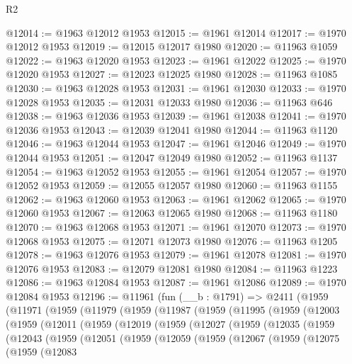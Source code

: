 \begin{lexlean}{R2}
\begin{coremodule}
@12014 := @1963 @12012 @1953
@12015 := @1961 @12014
@12017 := @1970 @12012 @1953
@12019 := @12015 @12017 @1980
@12020 := @11963 @1059
@12022 := @1963 @12020 @1953
@12023 := @1961 @12022
@12025 := @1970 @12020 @1953
@12027 := @12023 @12025 @1980
@12028 := @11963 @1085
@12030 := @1963 @12028 @1953
@12031 := @1961 @12030
@12033 := @1970 @12028 @1953
@12035 := @12031 @12033 @1980
@12036 := @11963 @646
@12038 := @1963 @12036 @1953
@12039 := @1961 @12038
@12041 := @1970 @12036 @1953
@12043 := @12039 @12041 @1980
@12044 := @11963 @1120
@12046 := @1963 @12044 @1953
@12047 := @1961 @12046
@12049 := @1970 @12044 @1953
@12051 := @12047 @12049 @1980
@12052 := @11963 @1137
@12054 := @1963 @12052 @1953
@12055 := @1961 @12054
@12057 := @1970 @12052 @1953
@12059 := @12055 @12057 @1980
@12060 := @11963 @1155
@12062 := @1963 @12060 @1953
@12063 := @1961 @12062
@12065 := @1970 @12060 @1953
@12067 := @12063 @12065 @1980
@12068 := @11963 @1180
@12070 := @1963 @12068 @1953
@12071 := @1961 @12070
@12073 := @1970 @12068 @1953
@12075 := @12071 @12073 @1980
@12076 := @11963 @1205
@12078 := @1963 @12076 @1953
@12079 := @1961 @12078
@12081 := @1970 @12076 @1953
@12083 := @12079 @12081 @1980
@12084 := @11963 @1223
@12086 := @1963 @12084 @1953
@12087 := @1961 @12086
@12089 := @1970 @12084 @1953
@12196 := @11961
    (fun (__b : @1791) =>
    @2411
      (@1959
        (@11971
          (@1959
            (@11979
              (@1959
                (@11987
                  (@1959
                    (@11995
                      (@1959
                        (@12003
                          (@1959
                            (@12011
                              (@1959
                                (@12019
                                  (@1959
                                    (@12027
                                      (@1959
                                        (@12035
                                          (@1959
                                            (@12043
                                              (@1959
                                                (@12051
                                                  (@1959
                                                    (@12059
                                                      (@1959
                                                        (@12067
                                                          (@1959
                                                            (@12075
                                                              (@1959
                                                                (@12083

\end{coremodule}
\end{lexlean}
